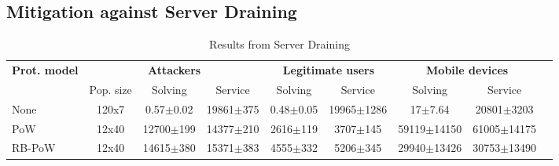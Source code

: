 \subsection{Mitigation against Server Draining}

  \begin{table}[H]
    \centering
    \tiny
    \caption{Results from Server Draining}\label{tab:draining}

    \begin{tabular}{lcccccccc} \toprule
      \multicolumn{1}{c}{\textbf{Prot. model}} & \multicolumn{3}{c}{\textbf{Attackers}} & \multicolumn{2}{c}{\textbf{Legitimate users}} & \multicolumn{2}{c}{\textbf{Mobile devices}} \\
      \multicolumn{1}{c}{} & \multicolumn{1}{c}{Pop. size} & \multicolumn{1}{c}{Solving} & \multicolumn{1}{c}{Service} & \multicolumn{1}{c}{Solving} & \multicolumn{1}{c}{Service} & \multicolumn{1}{c}{Solving} & \multicolumn{1}{c}{Service}  \\ \toprule
       None & 120x7  & 0.57$\pm$0.02 &  19861$\pm$375 & 0.48$\pm$0.05 & 19965$\pm$1286 & 17$\pm$7.64 & 20801$\pm$3203     \\ 
      PoW &  12x40  & 12700$\pm$199 & 14377$\pm$210 & 2616$\pm$119 & 3707$\pm$145 & 59119$\pm$14150 & 61005$\pm$14175    \\
      RB-PoW & 12x40 & 14615$\pm$380 & 15371$\pm$383 & 4555$\pm$332 & 5206$\pm$345 & 29940$\pm$13426 & 30753$\pm$13490   \\ \bottomrule
    \end{tabular}
  \end{table}
